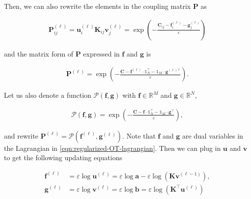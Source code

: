 Then, we can also rewrite the elements in the coupling matrix $\mathbf{P}$ as

\begin{equation*}
  \begin{aligned}
    \mathbf{P}_{ij}^{(\ell)}
    = \mathbf{u}_i^{(\ell)} \mathbf{K}_{ij} \mathbf{v}_j^{(\ell)}
    = \exp \left(
    -\frac{\mathbf{C}_{ij} - \mathbf{f}^{(\ell)}_i - \mathbf{g}^{(\ell)}_j}{\varepsilon}
    \right)
  \end{aligned}
\end{equation*}

and the matrix form of $\mathbf{P}$ expressed in $\mathbf{f}$ and $\mathbf{g}$ is

\begin{equation}\label{eqn:optimal-coupling-fg}
  \begin{aligned}
    \mathbf{P}^{(\ell)} = \exp \left(
    - \frac{\mathbf{C} - \mathbf{f}^{(\ell)} \cdot \mathbb{1}_N^\top -
      \mathbb{1}_M \cdot \mathbf{g}^{(\ell)\top}}{\varepsilon}
    \right).
  \end{aligned}
\end{equation}

Let us also denote a function $\mathcal{P}(\mathbf{f}, \mathbf{g})$ with
$\mathbf{f} \in \mathbb{R}^M$ and $\mathbf{g} \in \mathbb{R}^N$,

\begin{equation}\label{eqn:function-P}
  \begin{aligned}
    \mathcal{P}(\mathbf{f}, \mathbf{g})
    = \exp \left(
    - \frac{
      \mathbf{C} - \mathbf{f} \cdot \mathbb{1}_N^\top - \mathbb{1}_M \cdot \mathbf{g}^\top
    }{\varepsilon}
    \right),
  \end{aligned}
\end{equation}

and rewrite $\mathbf{P}^{(\ell)} = \mathcal{P}\left(\mathbf{f}^{(\ell)}, \mathbf{g}^{(\ell)}\right)$.
Note that $\mathbf{f}$ and $\mathbf{g}$ are dual variables in the Lagrangian in \cref{eqn:regularized-OT-lagrangian}.
Then we can plug in $\mathbf{u}$ and $\mathbf{v}$ to get the following updating equations

\begin{equation}\label{eqn:log-sinkhorn-update1}
  \begin{aligned}
    \mathbf{f}^{(\ell)}
     & = \varepsilon\log \mathbf{u}^{(\ell)}
    = \varepsilon\log \mathbf{a} - \varepsilon\log (\mathbf{K} \mathbf{v}^{(\ell-1)}), \\
    \mathbf{g}^{(\ell)}
     & = \varepsilon\log \mathbf{v}^{(\ell)}
    = \varepsilon\log \mathbf{b} = \varepsilon\log (\mathbf{K}^\top \mathbf{u}^{(\ell)})
  \end{aligned}
\end{equation}

